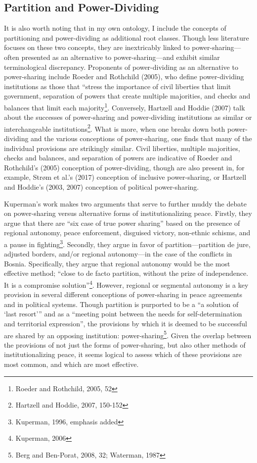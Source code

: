 \documentclass[12pt]{article}
\begin{document}
\subsection{Partition and Power-Dividing}
It is also worth noting that in my own ontology, I include the concepts of partitioning and power-dividing as additional root classes. Though less literature focuses on these two concepts, they are inextricably linked to power-sharing—often presented as an alternative to power-sharing—and exhibit similar terminological discrepancy. Proponents of power-dividing as an alternative to power-sharing include Roeder and Rothchild (2005), who define power-dividing institutions as those that “stress the importance of civil liberties that limit government, separation of powers that create multiple majorities, and checks and balances that limit each majority\footnote{Roeder and Rothchild, 2005, 52}. Conversely, Hartzell and Hoddie (2007) talk about the successes of power-sharing and power-dividing institutions as similar or interchangeable institutions\footnote{Hartzell and Hoddie, 2007, 150-152}. What is more, when one breaks down both power-dividing and the various conceptions of power-sharing, one finds that many of the individual provisions are strikingly similar. Civil liberties, multiple majorities, checks and balances, and separation of powers are indicative of Roeder and Rothchild’s (2005) conception of power-dividing, though are also present in, for example, Strøm et al.’s (2017) conception of inclusive power-sharing, or Hartzell and Hoddie’s (2003, 2007) conception of political power-sharing. 

Kuperman’s work makes two arguments that serve to further muddy the debate on power-sharing versus alternative forms of institutionalizing peace. Firstly, they argue that there are “six case of true power sharing” based on the presence of regional autonomy, peace enforcement, disguised victory, non-ethnic schisms, and a pause in fighting\footnote{Kuperman, 1996, emphasis added}. Secondly, they argue in favor of partition—partition de jure, adjusted borders, and/or regional autonomy—in the case of the conflicts in Bosnia. Specifically, they argue that regional autonomy would be the most effective method; “close to de facto partition, without the prize of independence. It is a compromise solution”\footnote{Kuperman, 2006}. However, regional or segmental autonomy is a key provision in several different conceptions of power-sharing in peace agreements and in political systems. Though partition is purported to be a “a solution of ‘last resort’” and as a “meeting point between the needs for self-determination and territorial expression”, the provisions by which it is deemed to be successful are shared by an opposing institution: power-sharing\footnote{Berg and Ben-Porat, 2008, 32; Waterman, 1987}. Given the overlap between the provisions of not just the forms of power-sharing, but also other methods of institutionalizing peace, it seems logical to assess which of these provisions are most common, and which are most effective. 
\end{document}
